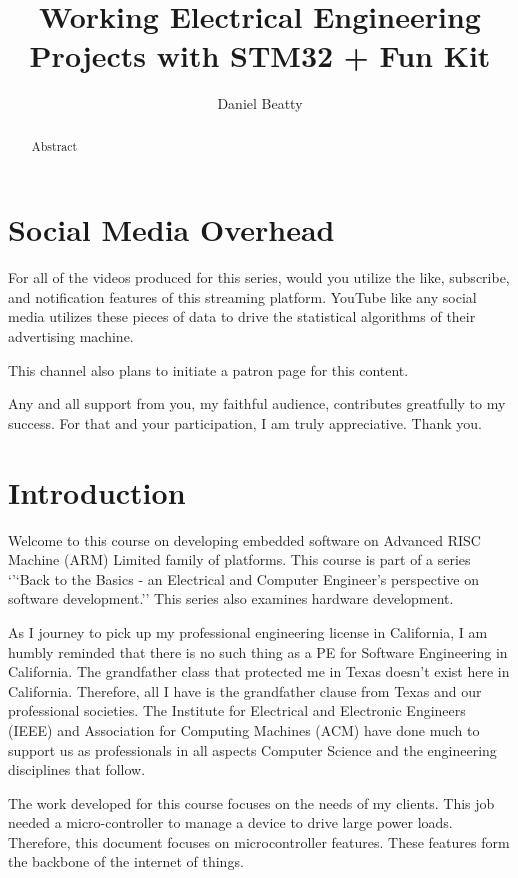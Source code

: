 \documentclass{article}
\title{Working Electrical Engineering Projects with STM32 + Fun Kit}
\author{Daniel Beatty}
\begin{document}
\maketitle

\begin{abstract}
    Abstract
\end{abstract}

\section{Social Media Overhead} %
\label{sec:social_media_overhead}

For all of the videos produced for this series, would you utilize the like, subscribe, and notification features of this streaming platform.  YouTube like any social media utilizes these pieces of data to drive the statistical algorithms of their advertising machine.  

This channel also plans to initiate a patron page for this content.  

Any and all support from you, my faithful audience, contributes greatfully to my success.  For that and your participation, I am truly appreciative.  Thank you.


\newpage
\section{Introduction}
Welcome to this course on developing embedded software on Advanced RISC Machine (ARM) Limited family of platforms.  This course is part of a series `'`Back to the Basics - an Electrical and Computer Engineer's perspective on software development.''  This series also examines hardware development.  

As I journey to pick up my professional engineering license in California, I am humbly reminded that there is no such thing as a PE for Software Engineering in California.   The grandfather class that protected me in Texas doesn't exist here in California.  Therefore, all I have is the grandfather clause from Texas and our professional societies.  The Institute for Electrical and Electronic Engineers (IEEE) and Association for Computing Machines (ACM) have done much to support us as professionals in all aspects Computer Science and the engineering disciplines that follow.

The work developed for this course focuses on the needs of my clients.  This job needed a micro-controller to manage a device to drive large power loads.  Therefore, this document focuses on microcontroller features.  These features form the backbone of the internet of things. 
\end{document}

